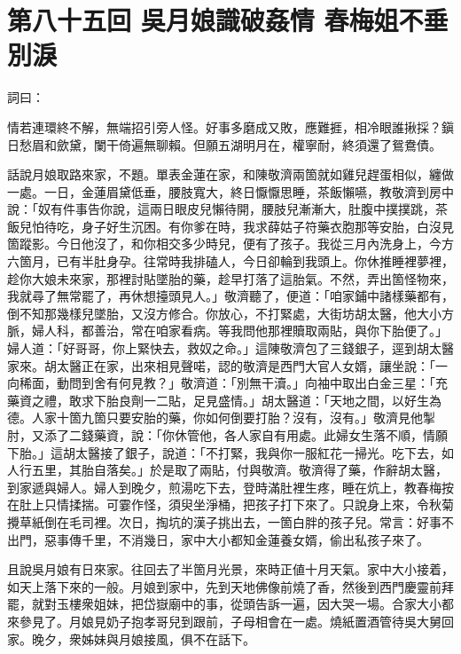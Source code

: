
\chapter*{第八十五回 吳月娘識破姦情 春梅姐不垂別淚}


詞曰：

\begin{myquote}
情若連環終不解，無端招引旁人怪。好事多磨成又敗，應難捱，相冷眼誰揪採？鎭日愁眉和歛黛，闌干倚遍無聊賴。但願五湖明月在，權寧耐，終須還了鴛鴦債。

\end{myquote}

話說月娘取路來家，不題。單表金蓮在家，和陳敬濟兩箇就如雞兒趕蛋相似，纏做一處。一日，金蓮眉黛低垂，腰肢寬大，終日懨懨思睡，茶飯懶嚥，教敬濟到房中說：「奴有件事告你說，這兩日眼皮兒懶待開，腰肢兒漸漸大，肚腹中撲撲跳，茶飯兒怕待吃，身子好生沉困。有你爹在時，我求薛姑子符藥衣胞那等安胎，白沒見箇蹤影。今日他沒了，和你相交多少時兒，便有了孩子。{}我從三月內洗身上，今方六箇月，已有半肚身孕。往常時我排磕人，今日卻輪到我頭上。你休推睡裡夢裡，趁你大娘未來家，那裡討貼墜胎的藥，趁早打落了這胎氣。不然，弄出箇怪物來，我就尋了無常罷了，再休想擡頭見人。」敬濟聽了，便道：「咱家鋪中諸樣藥都有，倒不知那幾樣兒墜胎，又沒方修合。你放心，不打緊處，大街坊胡太醫，他大小方脈，婦人科，都善治，常在咱家看病。等我問他那裡贖取兩貼，與你下胎便了。」婦人道：「好哥哥，你上緊快去，救奴之命。」這陳敬濟包了三錢銀子，逕到胡太醫家來。胡太醫正在家，出來相見聲喏，認的敬濟是西門大官人女婿，讓坐說：「一向稀面，動問到舍有何見教？」敬濟道：「別無干瀆。」向袖中取出白金三星：「充藥資之禮，敢求下胎良劑一二貼，足見盛情。」胡太醫道：「天地之間，以好生為德。人家十箇九箇只要安胎的藥，你如何倒要打胎？沒有，沒有。」敬濟見他掣肘，又添了二錢藥資，說：「你休管他，各人家自有用處。此婦女生落不順，情願下胎。」這胡太醫接了銀子，說道：「不打緊，我與你一服紅花一掃光。吃下去，如人行五里，其胎自落矣。」於是取了兩貼，付與敬濟。敬濟得了藥，作辭胡太醫，到家遞與婦人。婦人到晚夕，煎湯吃下去，登時滿肚裡生疼，睡在炕上，教春梅按在肚上只情揉揣。可霎作怪，須臾坐淨桶，把孩子打下來了。只說身上來，令秋菊攪草紙倒在毛司裡。次日，掏坑的漢子挑出去，一箇白胖的孩子兒。常言：好事不出門，惡事傳千里，不消幾日，家中大小都知金蓮養女婿，偷出私孩子來了。

且說吳月娘有日來家。往回去了半箇月光景，來時正値十月天氣。家中大小接着，如天上落下來的一般。{}月娘到家中，先到天地佛像前燒了香，然後到西門慶靈前拜罷，就對玉樓衆姐妹，把岱嶽廟中的事，從頭告訴一遍，因大哭一場。{}合家大小都來參見了。月娘見奶子抱孝哥兒到跟前，子母相會在一處。燒紙置酒管待吳大舅回家。晚夕，衆姊妹與月娘接風，俱不在話下。


